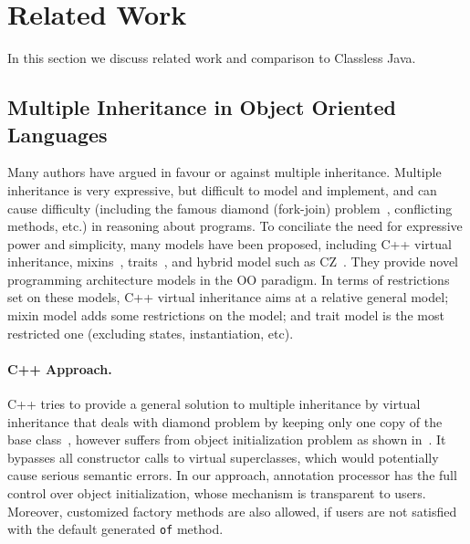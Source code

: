 \section{Related Work}\label{sec:related}
In this section we discuss related work and comparison to Classless Java.



\subsection{Multiple Inheritance in Object Oriented Languages}
Many authors have argued in favour or against multiple inheritance.  Multiple
inheritance is very expressive, but difficult to model and implement, and can
cause difficulty (including the famous diamond (fork-join)
problem~\cite{bracha90mixin,Sak89dis}, conflicting methods, etc.) in reasoning about 
programs. To conciliate the need for expressive power and simplicity, many
models have been proposed, including C++ virtual inheritance,
mixins~\cite{bracha90mixin}, traits~\cite{scharli03traits}, and hybrid model
such as CZ~\cite{malayeri2009cz}.  They provide novel programming architecture
models in the OO paradigm. In terms of restrictions set on these models, C++
virtual inheritance aims at a relative general model; mixin model adds some
restrictions on the model; and trait model is the most restricted one (excluding
states, instantiation, etc).

\paragraph{C++ Approach.}
C++ tries to provide a general solution to multiple inheritance by virtual
inheritance that deals with diamond problem by keeping only one copy of the base
class~\cite{ellis1990annotated}, however suffers from object initialization
problem as shown in~\cite{malayeri2009cz}. It bypasses all constructor calls to
virtual superclasses, which would potentially cause serious semantic errors. In
our approach, \mixin annotation processor has the full control over object
initialization, whose mechanism is transparent to users. Moreover, customized
factory methods are also allowed, if users are not satisfied with the default
generated \texttt{of} method.


